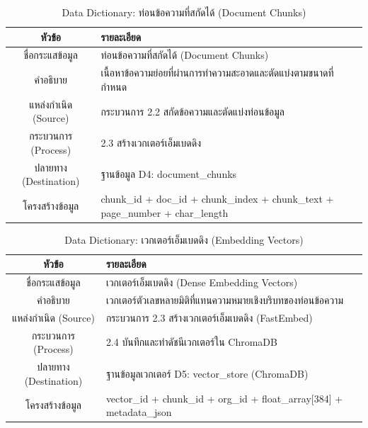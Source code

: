 \begin{table}[htbp]
\centering
\caption{Data Dictionary: ท่อนข้อความที่สกัดได้ (Document Chunks)}
\label{tab3:df_chunks}
\begin{tabularx}{\textwidth}{| c | L |}
\hline
\textbf{หัวข้อ} & \textbf{รายละเอียด} \\ \hline
ชื่อกระแสข้อมูล & ท่อนข้อความที่สกัดได้ (Document Chunks) \\ \hline
คำอธิบาย & เนื้อหาข้อความย่อยที่ผ่านการทำความสะอาดและตัดแบ่งตามขนาดที่กำหนด \\ \hline
แหล่งกำเนิด (Source) & กระบวนการ 2.2 สกัดข้อความและตัดแบ่งท่อนข้อมูล \\ \hline
กระบวนการ (Process) & 2.3 สร้างเวกเตอร์เอ็มเบดดิง \\ \hline
ปลายทาง (Destination) & ฐานข้อมูล D4: document\_chunks \\ \hline
โครงสร้างข้อมูล & chunk\_id + doc\_id + chunk\_index + chunk\_text + page\_number + char\_length \\ \hline
\end{tabularx}
\end{table}

\begin{table}[htbp]
\centering
\caption{Data Dictionary: เวกเตอร์เอ็มเบดดิง (Embedding Vectors)}
\label{tab3:df_vectors}
\begin{tabularx}{\textwidth}{| c | L |}
\hline
\textbf{หัวข้อ} & \textbf{รายละเอียด} \\ \hline
ชื่อกระแสข้อมูล & เวกเตอร์เอ็มเบดดิง (Dense Embedding Vectors) \\ \hline
คำอธิบาย & เวกเตอร์ตัวเลขหลายมิติที่แทนความหมายเชิงบริบทของท่อนข้อความ \\ \hline
แหล่งกำเนิด (Source) & กระบวนการ 2.3 สร้างเวกเตอร์เอ็มเบดดิง (FastEmbed) \\ \hline
กระบวนการ (Process) & 2.4 บันทึกและทำดัชนีเวกเตอร์ใน ChromaDB \\ \hline
ปลายทาง (Destination) & ฐานข้อมูลเวกเตอร์ D5: vector\_store (ChromaDB) \\ \hline
โครงสร้างข้อมูล & vector\_id + chunk\_id + org\_id + float\_array[384] + metadata\_json \\ \hline
\end{tabularx}
\end{table}

